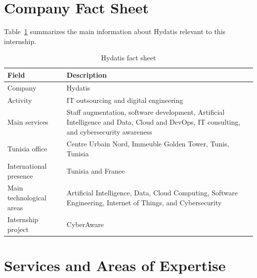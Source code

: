 \documentclass[12pt,a4paper]{report}
\begin{document}
\section{Company Fact Sheet}

Table~\ref{tab:hydatis-fact-sheet} summarizes the main information about Hydatis relevant to this internship.

\begin{table}[H]
\centering
\begin{tabular}{@{}>{\raggedright\arraybackslash}p{4cm}
                >{\raggedright\arraybackslash}p{9cm}@{}}

\toprule

\textbf{Field} & \textbf{Description} \\

\midrule

Company & Hydatis \\

Activity & IT outsourcing and digital engineering \\

Main services & Staff augmentation, software development, Artificial Intelligence and Data, Cloud and DevOps, IT consulting, and cybersecurity awareness \\

Tunisia office & Centre Urbain Nord, Immeuble Golden Tower, Tunis, Tunisia \\

International presence & Tunisia and France \\

Main technological areas & Artificial Intelligence, Data, Cloud Computing, Software Engineering, Internet of Things, and Cybersecurity \\

Internship project & CyberAware \\

\bottomrule

\end{tabular}

\caption{Hydatis fact sheet}
\label{tab:hydatis-fact-sheet}

\end{table}

\section{Services and Areas of Expertise}
\end{document}

